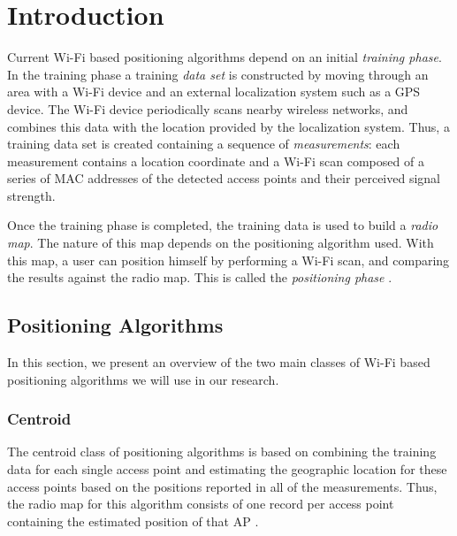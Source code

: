 \documentclass{sig-alternate-br}
\begin{document}


\section{Introduction}
Current Wi-Fi based positioning algorithms depend on an initial \textit{training phase}. In the training phase a training \textit{data set} is constructed by moving through an area with a Wi-Fi device and an external localization system such as a GPS device. The Wi-Fi device periodically scans nearby wireless networks, and combines this data with the location provided by the localization system. Thus, a training data set is created containing a sequence of \textit{measurements}: each measurement contains a location coordinate and a Wi-Fi scan composed of a series of MAC addresses of the detected access points and their perceived signal strength.

Once the training phase is completed, the training data is used to build a \textit{radio map}. The nature of this map depends on the positioning algorithm used. With this map, a user can position himself by performing a Wi-Fi scan, and comparing the results against the radio map. This is called the \textit{positioning phase} \cite{cheng:metropolitan-scale}.

\subsection{Positioning Algorithms}
In this section, we present an overview of the two main classes of Wi-Fi based positioning algorithms we will use in our research. 

\vspace{10 mm}

\subsubsection{Centroid}
The centroid class of positioning algorithms is based on combining the training data for each single access point and estimating the geographic location for these access points based on the positions reported in all of the measurements. Thus, the radio map for this algorithm consists of one record per access point containing the estimated position of that AP \cite{tsui:war-walking}. 
\end{document}
